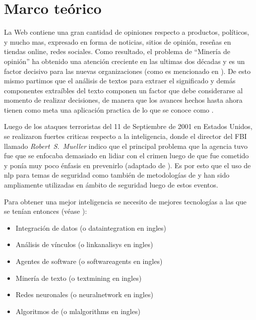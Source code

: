\chapter{Marco teórico} %

\label{ch:MarcoTeorico} %



La Web contiene una gran cantidad de opiniones respecto a productos, políticos, y mucho mas, expresado en forma de noticias, sitios de opinión, reseñas en tiendas online, redes sociales. Como resultado, el problema de ``Minería de opinión'' ha obtenido una atención creciente en las ultimas dos décadas y es un factor decisivo para las nuevas organizaciones (como es mencionado en \cite{Popescu2007}). De esto mismo partimos que el análisis de textos para extraer el significado y demás componentes extraíbles del texto componen un factor que debe considerarse al momento de realizar decisiones, de manera que los avances hechos hasta ahora tienen como meta una aplicación practica de lo que se conoce como .

Luego de los ataques terroristas del 11 de Septiembre de 2001 en Estados Unidos, se realizaron fuertes criticas respecto a la inteligencia, donde el director del FBI llamado \mbox{\emph{Robert~S.~Mueller}} indico que el principal problema que la agencia tuvo fue que se enfocaba demasiado en lidiar con el crimen luego de que fue cometido y ponía muy poco énfasis en prevenirlo (adaptado de \cite{mena2003investigative}). Es por esto que el uso de \gls{nlp} para temas de seguridad como también de metodologías de  y  han sido ampliamente utilizadas en ámbito de seguridad luego de estos eventos.

Para obtener una mejor inteligencia se necesito de mejores tecnologías a las que se tenían entonces (véase \cite[p\'ag 2]{mena2003investigative}):
\begin{itemize}
\item Integración de datos (o \gls{dataintegration} en ingles)
\item Análisis de vínculos (o \gls{linkanalisys} en ingles)
\item Agentes de software (o \gls{softwareagents} en ingles)
\item Minería de texto (o \gls{textmining} en ingles)
\item Redes neuronales (o \gls{neuralnetwork} en ingles)
\item Algoritmos de  (o \gls{mlalgorithms} en ingles)
\end{itemize}

